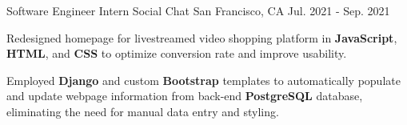 \begin{cventries}
\cventry
  {Software Engineer Intern} %
  {Social Chat} %
  {San Francisco, CA} %
  {Jul. 2021 - Sep. 2021} %
  {
    \begin{cvitems} %
      \item {Redesigned homepage for livestreamed video shopping platform in \textbf{JavaScript}, \textbf{HTML}, and \textbf{CSS} to optimize conversion rate and improve usability.}
      \item {Employed \textbf{Django} and custom \textbf{Bootstrap} templates to automatically populate and update webpage information from back-end \textbf{PostgreSQL} database, eliminating the need for manual data entry and styling.}
    \end{cvitems}
  }



\end{cventries}
